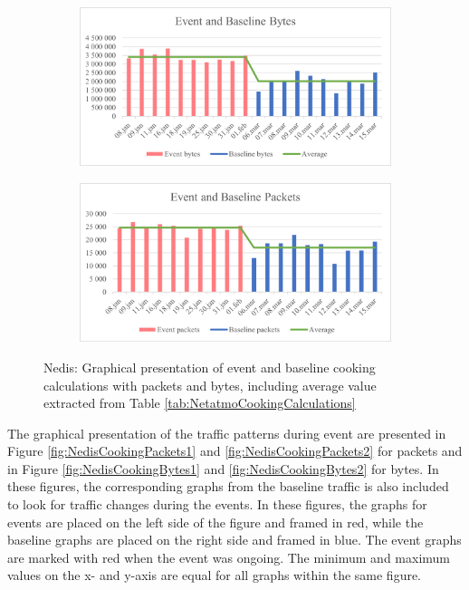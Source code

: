 \begin{figure}[H]
    \centering
    \begin{subfigure}{0.8\textwidth}
        \centering
        \includegraphics[width=1\hsize]{figures/Nedis_Cooking_Calculations_Bytes.png} 
    \end{subfigure}
    \begin{subfigure}{0.8\textwidth}
        \centering
        \includegraphics[width=1\hsize]{figures/Nedis_Cooking_Calculations_Packets.png} 
    \end{subfigure}
    \caption{Nedis: Graphical presentation of event and baseline cooking calculations with packets and bytes, including average value extracted from Table \ref{tab:NetatmoCookingCalculations}}
    \label{fig:NedisCookingCalculations}
\end{figure}

The graphical presentation of the traffic patterns during event are presented in Figure \ref{fig:NedisCookingPackets1} and \ref{fig:NedisCookingPackets2} for packets and in Figure \ref{fig:NedisCookingBytes1} and \ref{fig:NedisCookingBytes2} for bytes. In these figures, the corresponding graphs from the baseline traffic is also included to look for traffic changes during the events. In these figures, the graphs for events are placed on the left side of the figure and framed in red, while the baseline graphs are placed on the right side and framed in blue. The event graphs are marked with red when the event was ongoing. The minimum and maximum values on the x- and y-axis are equal for all graphs within the same figure. 

